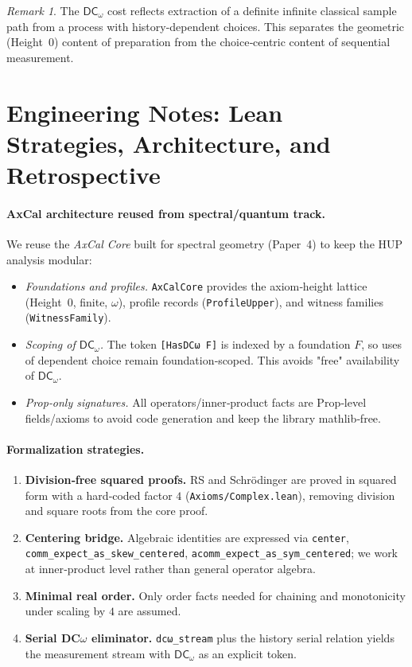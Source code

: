 \documentclass[11pt]{article}
\newcommand{\DCw}{\mathsf{DC}_{\omega}}
\newcommand{\lean}[1]{\texttt{#1}}
\theoremstyle{plain}
\theoremstyle{definition}
\theoremstyle{remark}
\newtheorem{remark}[theorem]{Remark}
\begin{document}
\begin{remark}
The $\DCw$ cost reflects extraction of a definite infinite classical sample path from a process with history-dependent choices.
This separates the geometric (Height~0) content of preparation from the choice‑centric content of sequential measurement.
\end{remark}

\section{Engineering Notes: Lean Strategies, Architecture, and Retrospective}
\label{sec:engineering}

\paragraph{AxCal architecture reused from spectral/quantum track.}
We reuse the \emph{AxCal Core} built for spectral geometry (Paper~4) to keep the HUP analysis modular:
\begin{itemize}
  \item \emph{Foundations and profiles.} \lean{AxCalCore} provides the axiom‑height lattice (Height~0, finite, $\omega$), profile records (\lean{ProfileUpper}), and witness families (\lean{WitnessFamily}).
  \item \emph{Scoping of $\DCw$.} The token \lean{[HasDCω F]} is indexed by a foundation $F$, so uses of dependent choice remain foundation‑scoped. This avoids "free" availability of $\DCw$.
  \item \emph{Prop‑only signatures.} All operators/inner‑product facts are Prop‑level fields/axioms to avoid code generation and keep the library mathlib‑free.
\end{itemize}

\paragraph{Formalization strategies.}
\begin{enumerate}
  \item \textbf{Division‑free squared proofs.} RS and Schrödinger are proved in squared form with a hard‑coded factor $4$ (\texttt{Axioms/Complex.lean}), removing division and square roots from the core proof.
  \item \textbf{Centering bridge.} Algebraic identities are expressed via \lean{center}, \lean{comm\_expect\_as\_skew\_centered}, \lean{acomm\_expect\_as\_sym\_centered}; we work at inner‑product level rather than general operator algebra.
  \item \textbf{Minimal real order.} Only order facts needed for chaining and monotonicity under scaling by $4$ are assumed.
  \item \textbf{Serial DC$\omega$ eliminator.} \lean{dcω\_stream} plus the history serial relation yields the measurement stream with $\DCw$ as an explicit token.
\end{enumerate}
\end{document}
